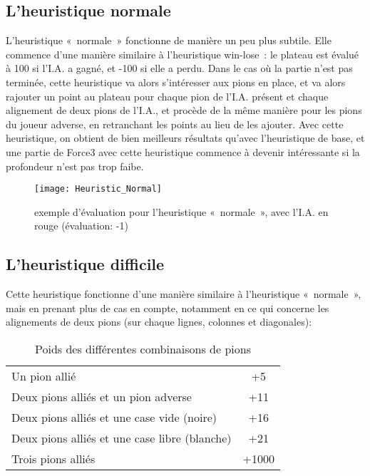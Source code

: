 \subsection{L'heuristique normale}

L'heuristique « normale » fonctionne de manière un peu plus subtile. Elle commence d'une manière similaire
à l'heuristique win-lose : le plateau est évalué à 100 si l'I.A. a gagné, et -100 si elle a perdu.
Dans le cas où la partie n'est pas terminée, cette heuristique va alors s'intéresser aux pions en place,
et va alors rajouter un point au plateau pour chaque pion de l'I.A. présent et chaque alignement de deux
pions de l'I.A., et procède de la même manière pour les pions du joueur adverse, en retranchant les points
au lieu de les ajouter. Avec cette heuristique, on obtient de bien meilleurs résultats qu'avec l'heuristique
de base, et une partie de Force3 avec cette heuristique commence à devenir intéressante si la
profondeur n'est pas trop faibe.

\begin{figure}[H]
    \centering
    \texttt{[image: Heuristic\_Normal]}{}
    \caption{exemple d'évaluation pour l'heuristique « normale », avec l'I.A. en rouge (évaluation: -1)}
\end{figure}

\subsection{L'heuristique difficile}

Cette heuristique fonctionne d'une manière similaire à l'heuristique « normale », mais en prenant plus de
cas en compte, notamment en ce qui concerne les alignements de deux pions (sur chaque lignes, colonnes et diagonales):

\begin{table}[H]
    \begin{tabular}{lc}
        Un pion allié                                 & +5    \\
        Deux pions alliés et un pion adverse          & +11   \\
        Deux pions alliés et une case vide (noire)    & +16   \\
        Deux pions alliés et une case libre (blanche) & +21   \\
        Trois pions alliés                            & +1000 \\
    \end{tabular}
    \caption{Poids des différentes combinaisons de pions}
\end{table}

